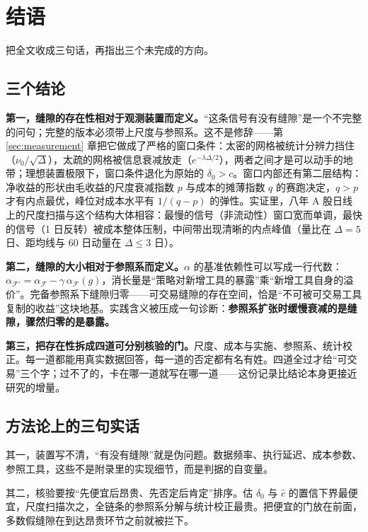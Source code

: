 \section{结语}\label{sec:conclusion}

把全文收成三句话，再指出三个未完成的方向。

\subsection{三个结论}

\textbf{第一，缝隙的存在性相对于观测装置而定义。}“这条信号有没有缝隙”是一个不完整的问句；完整的版本必须带上尺度与参照系。这不是修辞——第 \ref{sec:measurement} 章把它做成了严格的窗口条件：太密的网格被统计分辨力挡住（$\nu_0/\sqrt{\Delta}$），太疏的网格被信息衰减放走（$e^{-\lambda\Delta/2}$），两者之间才是可以动手的地带；理想装置极限下，窗口条件退化为原始的 $\delta_0>c$。窗口内部还有第二层结构：净收益的形状由毛收益的尺度衰减指数 $p$ 与成本的摊薄指数 $q$ 的赛跑决定，$q>p$ 才有内点最优，峰位对成本水平有 $1/(q-p)$ 的弹性。实证里，八年 A 股日线上的尺度扫描与这个结构大体相容：最慢的信号（非流动性）窗口宽而单调，最快的信号（1 日反转）被成本整体压制，中间带出现清晰的内点峰值（量比在 $\Delta=5$ 日、距均线与 60 日动量在 $\Delta\le3$ 日）。

\textbf{第二，缝隙的大小相对于参照系而定义。}$\alpha$ 的基准依赖性可以写成一行代数：$\alpha_{\mathcal{F}'}=\alpha_{\mathcal{F}}-\gamma\,\alpha_{\mathcal{F}}(g)$，消长量是“策略对新增工具的暴露”乘“新增工具自身的溢价”。完备参照系下缝隙归零——可交易缝隙的存在空间，恰是“不可被可交易工具复制的收益”这块地基。实践含义被压成一句诊断：\textbf{参照系扩张时缓慢衰减的是缝隙，骤然归零的是暴露。}

\textbf{第三，把存在性拆成四道可分别核验的门。}尺度、成本与实施、参照系、统计校正。每一道都能用真实数据回答，每一道的否定都有名有姓。四道全过才给“可交易”三个字；过不了的，卡在哪一道就写在哪一道——这份记录比结论本身更接近研究的增量。

\subsection{方法论上的三句实话}

其一，装置写不清，“有没有缝隙”就是伪问题。数据频率、执行延迟、成本参数、参照工具，这些不是附录里的实现细节，而是判据的自变量。

其二，核验要按“先便宜后昂贵、先否定后肯定”排序。估 $\hat\delta_0$ 与 $\hat c$ 的置信下界最便宜，尺度扫描次之，全链条的参照系分解与统计校正最贵。把便宜的门放在前面，多数假缝隙在到达昂贵环节之前就被拦下。

